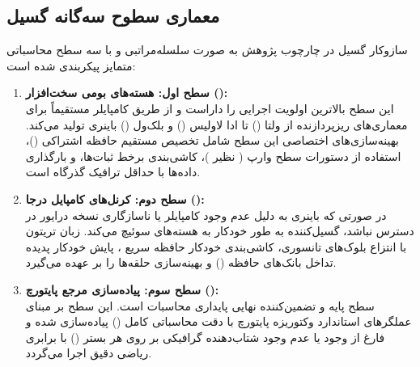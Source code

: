 \documentclass[12pt,a4paper]{report}
\theoremstyle{definition}
\begin{document}
\subsection{معماری سطوح سه‌گانه گسیل}
سازوکار گسیل در چارچوب پژوهش به صورت سلسله‌مراتبی و با سه سطح محاسباتی متمایز پیکربندی شده است:
\begin{enumerate}
    \item \textbf{سطح اول: هسته‌های بومی سخت‌افزار ():} \\
    این سطح بالاترین اولویت اجرایی را داراست و از طریق کامپایلر  مستقیماً برای معماری‌های ریزپردازنده از ولتا () تا ادا لاولیس () و بلک‌ول () باینری تولید می‌کند. بهینه‌سازی‌های اختصاصی این سطح شامل تخصیص مستقیم حافظه اشتراکی ()، استفاده از دستورات سطح وارپ ( نظیر )، کاشی‌بندی برخط ثبات‌ها، و بارگذاری داده‌ها با حداقل ترافیک گذرگاه  است.

    \item \textbf{سطح دوم: کرنل‌های کامپایل درجا ():} \\
    در صورتی که باینری  به دلیل عدم وجود کامپایلر یا ناسازگاری نسخه درایور در دسترس نباشد، گسیل‌کننده به طور خودکار به هسته‌های  سوئیچ می‌کند. زبان تریتون با انتزاع بلوک‌های تانسوری، کاشی‌بندی خودکار حافظه سریع ، پایش خودکار پدیده تداخل بانک‌های حافظه () و بهینه‌سازی حلقه‌ها را بر عهده می‌گیرد.

    \item \textbf{سطح سوم: پیاده‌سازی مرجع پایتورچ ():} \\
    سطح پایه و تضمین‌کننده نهایی پایداری محاسبات است. این سطح بر مبنای عملگرهای استاندارد وکتوریزه پایتورچ با دقت محاسباتی کامل () پیاده‌سازی شده و فارغ از وجود یا عدم وجود شتاب‌دهنده گرافیکی بر روی هر بستر () با برابری ریاضی دقیق اجرا می‌گردد.
\end{enumerate}
\end{document}
